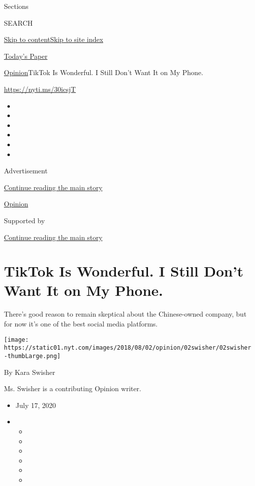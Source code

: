 Sections

SEARCH

\protect\hyperlink{site-content}{Skip to
content}\protect\hyperlink{site-index}{Skip to site index}

\href{https://myaccount.nytimes.com/auth/login?response_type=cookie\&client_id=vi}{}

\href{https://www.nytimes.com/section/todayspaper}{Today's Paper}

\href{/section/opinion}{Opinion}\textbar{}TikTok Is Wonderful. I Still
Don't Want It on My Phone.

\href{https://nyti.ms/30icsjT}{https://nyti.ms/30icsjT}

\begin{itemize}
\item
\item
\item
\item
\item
\item
\end{itemize}

Advertisement

\protect\hyperlink{after-top}{Continue reading the main story}

\href{/section/opinion}{Opinion}

Supported by

\protect\hyperlink{after-sponsor}{Continue reading the main story}

\hypertarget{tiktok-is-wonderful-i-still-dont-want-it-on-my-phone}{%
\section{TikTok Is Wonderful. I Still Don't Want It on My
Phone.}\label{tiktok-is-wonderful-i-still-dont-want-it-on-my-phone}}

There's good reason to remain skeptical about the Chinese-owned company,
but for now it's one of the best social media platforms.

\texttt{[image: https://static01.nyt.com/images/2018/08/02/opinion/02swisher/02swisher-thumbLarge.png]}

By Kara Swisher

Ms. Swisher is a contributing Opinion writer.

\begin{itemize}
\item
  July 17, 2020
\item
  \begin{itemize}
  \item
  \item
  \item
  \item
  \item
  \item
  \end{itemize}
\end{itemize}


